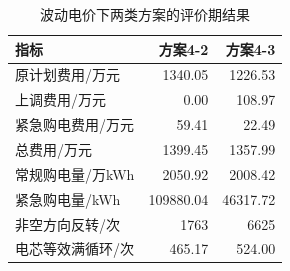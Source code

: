 \begin{table}[H]
\centering\small
\caption{波动电价下两类方案的评价期结果}\label{tab:q4-annual}
\begin{tabular}{lrr}
\toprule
指标 & 方案4-2 & 方案4-3\\
\midrule
原计划费用/万元 & 1340.05 & 1226.53\\
上调费用/万元 & 0.00 & 108.97\\
紧急购电费用/万元 & 59.41 & 22.49\\
总费用/万元 & 1399.45 & 1357.99\\
常规购电量/万kWh & 2050.92 & 2008.42\\
紧急购电量/kWh & 109880.04 & 46317.72\\
非空方向反转/次 & 1763 & 6625\\
电芯等效满循环/次 & 465.17 & 524.00\\
\bottomrule
\end{tabular}
\end{table}
